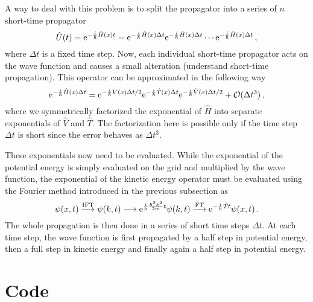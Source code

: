 A way to deal with this problem is to split the propagator into a series of $n$ short-time propagator
\begin{equation}
    \hat{U}(t) = \mathrm{e}^{-\frac{i}{\hbar}\hat{H}(x)t} = \mathrm{e}^{-\frac{i}{\hbar}\hat{H}(x)\Delta t} \mathrm{e}^{-\frac{i}{\hbar}\hat{H}(x)\Delta t} \cdots \mathrm{e}^{-\frac{i}{\hbar}\hat{H}(x)\Delta t} \, ,
    \label{eq:U4}
\end{equation}
where $\Delta t$ is a fixed time step. Now, each individual short-time propagator acts on the wave function and causes a small alteration (understand short-time propagation). This operator can be approximated in the following way
\begin{equation}
    \mathrm{e}^{-\frac{i}{\hbar}\hat{H}(x)\Delta t} = \mathrm{e}^{-\frac{i}{\hbar}V(x)\Delta t/2}\mathrm{e}^{-\frac{i}{\hbar}\hat{T}(x)\Delta t}\mathrm{e}^{-\frac{i}{\hbar}\hat{V}(x)\Delta t/2} + \mathcal{O}(\Delta t^3) \, ,
\end{equation}
where we symmetrically factorized the exponential of $\hat{H}$ into separate exponentials of $\hat{V}$ and $\hat{T}$. The factorization here is possible only if the time step $\Delta t$ is short since the error behaves as $\Delta t^3$. 

These exponentials now need to be evaluated. While the exponential of the potential energy is simply evaluated on the grid and multiplied by the wave function, the exponential of the kinetic energy operator must be evaluated using the Fourier method introduced in the previous subsection as
\begin{equation}
    \psi(x,t) \stackrel{\mathrm{IFT}}{\longrightarrow} \psi(k,t) \longrightarrow \mathrm{e}^{\frac{i}{\hbar} \frac{\hbar^2 k^2}{2m} t} \psi(k,t) \stackrel{\mathrm{FT}}{\longrightarrow} \mathrm{e}^{-\frac{i}{\hbar} \hat{T} t}\psi(x,t) \, .
\end{equation}
The whole propagation is then done in a series of short time steps $\Delta t$. At each time step, the wave function is first propagated by a half step in potential energy, then a full step in kinetic energy and finally again a half step in potential energy. 

\section{Code}

